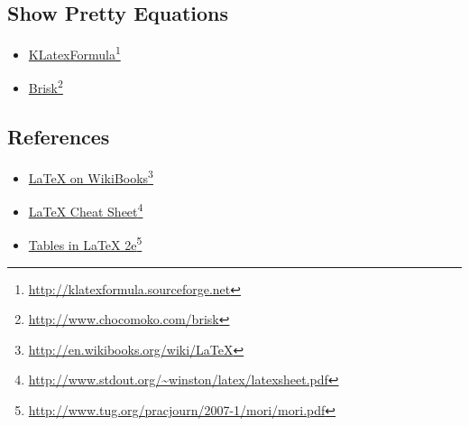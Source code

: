 \subsection{Show Pretty Equations}
\label{showprettyequations}

\begin{itemize}
\item \href{http://klatexformula.sourceforge.net}{KLatexFormula}\footnote{\href{http://klatexformula.sourceforge.net}{http:/\slash klatexformula.sourceforge.net}}

\item \href{http://www.chocomoko.com/brisk}{Brisk}\footnote{\href{http://www.chocomoko.com/brisk}{http:/\slash www.chocomoko.com\slash brisk}}

\end{itemize}

\subsection{References}
\label{references}

\begin{itemize}
\item \href{http://en.wikibooks.org/wiki/LaTeX}{LaTeX on WikiBooks}\footnote{\href{http://en.wikibooks.org/wiki/LaTeX}{http:/\slash en.wikibooks.org\slash wiki\slash LaTeX}}
\item \href{http://www.stdout.org/~winston/latex/latexsheet.pdf}{LaTeX Cheat Sheet}\footnote{\href{http://www.stdout.org/~winston/latex/latexsheet.pdf}{http:/\slash www.stdout.org\slash \textasciitilde winston\slash latex\slash latexsheet.pdf}}
\item \href{http://www.tug.org/pracjourn/2007-1/mori/mori.pdf}{Tables in LaTeX 2e}\footnote{\href{http://www.tug.org/pracjourn/2007-1/mori/mori.pdf}{http:/\slash www.tug.org\slash pracjourn\slash 2007-1\slash mori\slash mori.pdf}}

\end{itemize}
